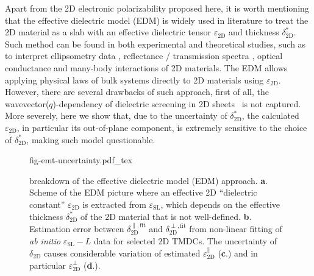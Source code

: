 Apart from the 2D electronic polarizability proposed here, it is worth
mentioning that the effective dielectric model (EDM) is widely used in
literature to treat the 2D material as a slab with an effective
dielectric tensor $\varepsilon_{\mathrm{2D}}$ and thickness
$\delta^{*}_{\mathrm{2D}}$. Such method can be found in both
experimental and theoretical studies, such as to interpret
ellipsometry data
\cite{graphene-epsilon10,Duesberg_2014_opt_MoS2,Chiang13,},
reflectance / transmission spectra
\cite{Li_2014_opt_ml_mos2,Yoffe-Wilson_1969_TMDC}, optical conductance
\cite{Matthes_2016_effective_PRB} and many-body interactions
\cite{Sohier_2016_2D_eps,Markel_2016_EMT} of 2D materials. The EDM
allows applying physical laws of bulk systems directly to 2D materials
using $\varepsilon_{\mathrm{2D}}$. However, there are several
drawbacks of such approach, first of all, the
wavevector($q$)-dependency of dielectric screening in 2D
sheets~\cite{Cudazzo_2011_screening_2D,Olsen_2016_hydrogen,Trolle_2017_eps_subst}
is not captured. More severely, here we show that, due to the
uncertainty of $\delta^{*}_{\mathrm{2D}}$, the calculated
$\varepsilon_{\mathrm{2D}}$, in particular its out-of-plane component,
is extremely sensitive to the choice of $\delta^{*}_{\mathrm{2D}}$,
making such model questionable.


\begin{figure}[!htbp]
  \centering
  {fig-emt-uncertainty.pdf_tex}
  \caption{\label{fig-emt} %
    breakdown of the effective dielectric model (EDM)
    approach. \textbf{a}.  Scheme of the EDM picture where an
    effective 2D ``dielectric constant'' $\varepsilon_{\mathrm{2D}}$
    is extracted from $\varepsilon_{\mathrm{SL}}$, which depends on
    the effective thickness $\delta_{\mathrm{2D}}^{*}$ of the 2D
    material that is not well-defined. \textbf{b}.  Estimation error
    between $\delta_{\mathrm{2D}}^{\parallel, \text{fit}}$ and
    $\delta_{\mathrm{2D}}^{\perp, \text{fit}}$ from non-linear fitting
    of \textit{ab initio} $\varepsilon_{\mathrm{SL}} - L$ data for
    selected 2D TMDCs. The uncertainty of $\delta_{\mathrm{2D}}$
    causes considerable variation of estimated
    $\varepsilon_{\mathrm{2D}}^{\parallel}$ (\textbf{c}.) and in
    particular $\varepsilon_{\mathrm{2D}}^{\perp}$ (\textbf{d}.).  }
\end{figure}

